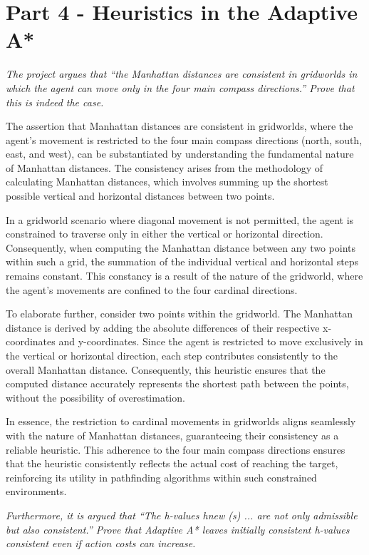 \graphicspath{{Images/}}

\section{Part 4 - Heuristics in the Adaptive A* }

\textit{The project argues that “the Manhattan distances are consistent in
gridworlds in which the agent can move only in the four main compass directions.” Prove that this is indeed the case.}

The assertion that Manhattan distances are consistent in gridworlds, where the agent's movement is restricted to the four main compass directions (north, south, east, and west), can be substantiated by understanding the fundamental nature of Manhattan distances. The consistency arises from the methodology of calculating Manhattan distances, which involves summing up the shortest possible vertical and horizontal distances between two points.

In a gridworld scenario where diagonal movement is not permitted, the agent is constrained to traverse only in either the vertical or horizontal direction. Consequently, when computing the Manhattan distance between any two points within such a grid, the summation of the individual vertical and horizontal steps remains constant. This constancy is a result of the nature of the gridworld, where the agent's movements are confined to the four cardinal directions.

To elaborate further, consider two points within the gridworld. The Manhattan distance is derived by adding the absolute differences of their respective x-coordinates and y-coordinates. Since the agent is restricted to move exclusively in the vertical or horizontal direction, each step contributes consistently to the overall Manhattan distance. Consequently, this heuristic ensures that the computed distance accurately represents the shortest path between the points, without the possibility of overestimation.

In essence, the restriction to cardinal movements in gridworlds aligns seamlessly with the nature of Manhattan distances, guaranteeing their consistency as a reliable heuristic. This adherence to the four main compass directions ensures that the heuristic consistently reflects the actual cost of reaching the target, reinforcing its utility in pathfinding algorithms within such constrained environments.

\textit{Furthermore, it is argued that “The h-values hnew (s) ... are not only admissible but also consistent.” Prove that Adaptive A*
leaves initially consistent h-values consistent even if action costs can increase.}

